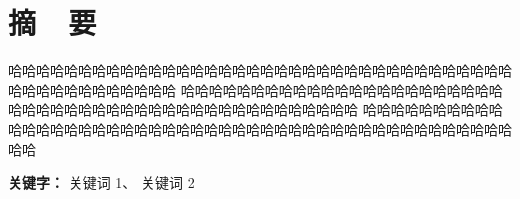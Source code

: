 \chapter*{摘~~要}

{
\linespread{1.5}
\stfangsong\xiaosi

哈哈哈哈哈哈哈哈哈哈哈哈哈哈哈哈哈哈哈哈哈哈哈哈哈哈哈哈哈哈哈哈哈哈哈哈哈哈哈哈哈哈哈哈哈哈哈哈
哈哈哈哈哈哈哈哈哈哈哈哈哈哈哈哈哈哈哈哈哈哈哈哈哈哈哈哈哈哈哈哈哈哈哈哈哈哈哈哈哈哈哈哈哈哈哈哈
哈哈哈哈哈哈哈哈哈哈哈哈哈哈哈哈哈哈哈哈哈哈哈哈哈哈哈哈哈哈哈哈哈哈哈哈哈哈哈哈哈哈哈哈哈哈哈哈

\setlength{\parindent}{0em}
\textbf{关键字：} \; 关键词 1、 \; 关键词 2 \par
}
